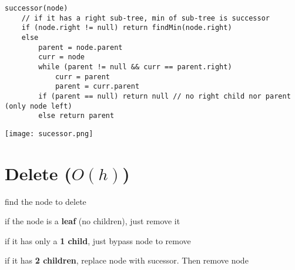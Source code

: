 \documentclass[12pt]{article}
\begin{document}
\begin{spacing}{1.5}
\begin{verbatim}
successor(node) 
    // if it has a right sub-tree, min of sub-tree is successor
    if (node.right != null) return findMin(node.right) 
    else 
        parent = node.parent
        curr = node
        while (parent != null && curr == parent.right) 
            curr = parent
            parent = curr.parent
        if (parent == null) return null // no right child nor parent (only node left)
        else return parent 
\end{verbatim}

\begin{center}
\texttt{[image: sucessor.png]}
\end{center}

\section{Delete ($O(h)$)}

\begin{enumerate*}
	\item find the node to delete
	\item if the node is a \textbf{leaf} (no children), just remove it
	\item if it has only a \textbf{1 child}, just bypass node to remove
	\item if it has \textbf{2 children}, replace node with sucessor. Then remove node 
\end{enumerate*}

\end{spacing}
\end{document}
